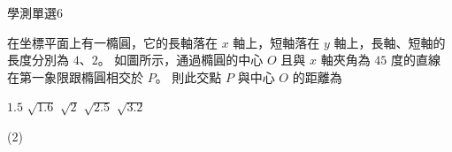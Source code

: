 \begin{QUESTIONS}
\begin{QUESTION}
\begin{QEMPTYSPACE}
        \end{QEMPTYSPACE}
    \end{QUESTION}
    \begin{QUESTION}
        \begin{ExamInfo}{91}{學測}{單選}{6}
        \end{ExamInfo}
        \begin{ExamAnsRateInfo}{33}{53}{32}{14}
        \end{ExamAnsRateInfo}
        \begin{QBODY}
            在坐標平面上有一橢圓，它的長軸落在 $x$ 軸上，短軸落在 $y$ 軸上，長軸、短軸的長度分別為 $4$、$2$。
            如圖所示，通過橢圓的中心 $O$ 且與 $x$ 軸夾角為 $45$ 度的直線在第一象限跟橢圓相交於 $P$。 則此交點 $P$ 與中心 $O$ 的距離為 
            
            
            \begin{QOPS} 
                \QOP $1.5$
                \QOP $\sqrt{1.6}$ 
                \QOP $\sqrt{2}$ 
                \QOP $\sqrt{2.5}$ 
                \QOP $
                \sqrt{3.2}$
            \end{QOPS}
        
        \end{QBODY}
        \begin{QFROMS}
        \end{QFROMS}
        \begin{QTAGS}\end{QTAGS}
        \begin{QANS}
            (2)
        \end{QANS}
        \begin{QSOLLIST}
        \end{QSOLLIST}
        \begin{QEMPTYSPACE}
        \end{QEMPTYSPACE}
    \end{QUESTION}
\end{QUESTIONS}
